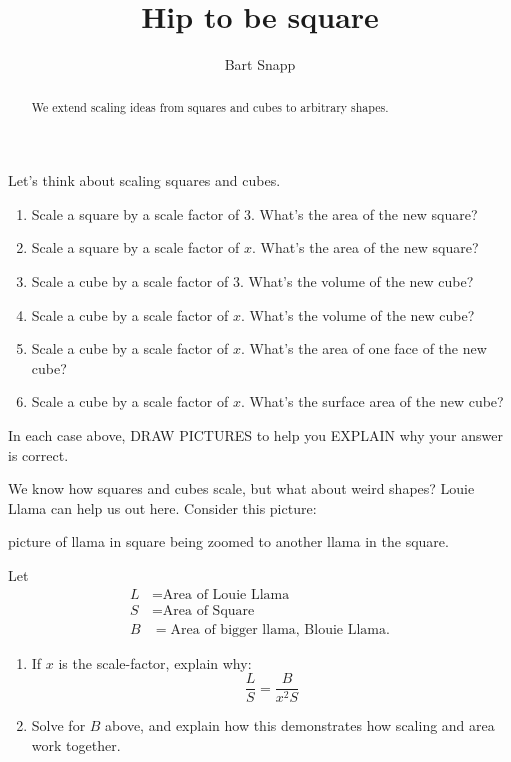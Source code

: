 \documentclass[nooutcomes,noauthor,hints]{ximera}
\title{Hip to be square}
\author{Bart Snapp}
\begin{document}
\begin{abstract}
  We extend scaling ideas from squares and cubes to arbitrary shapes.
\end{abstract}
\maketitle

\begin{listOutcomes}
\item 
\end{listOutcomes}




\mynewpage


\begin{question}
  Let's think about scaling squares and cubes.
  \begin{enumerate}
  \item Scale a square by a scale factor of $3$. What's the area of the new square? 
  \item Scale a square by a scale factor of $x$. What's the area of the new square?
  \item Scale a cube by a scale factor of $3$. What's the volume of the new cube?
  \item Scale a cube by a scale factor of $x$. What's the volume of the new cube?
  \item Scale a cube by a scale factor of $x$. What's the area of one face of the new cube?
  \item Scale a cube by a scale factor of $x$. What's the surface area of the new cube?
  \end{enumerate}
  In each case above, DRAW PICTURES to help you EXPLAIN why your
  answer is correct.
\end{question}
\mynewpage



\begin{question}
  We know how squares and cubes scale, but what about weird shapes?
  Louie Llama can help us out here.  Consider this picture:
  \begin{center}
    picture of llama in square being zoomed to another llama in the square.
  \end{center}
  Let
  \begin{align*}
    L &= \text{Area of Louie Llama}\\
    S &= \text{Area of Square}\\
    B &= \text{Area of bigger llama, Blouie Llama}.
  \end{align*}
  \begin{enumerate}
  \item If $x$ is the scale-factor, explain why:
    \[
    \frac{L}{S} = \frac{B}{x^2 S}
    \]
  \item Solve for $B$ above, and explain how this demonstrates how
    scaling and area work together.
  \end{enumerate}
  
\end{question}
\mynewpage


\begin{question}
 
\end{question}
\end{document}
